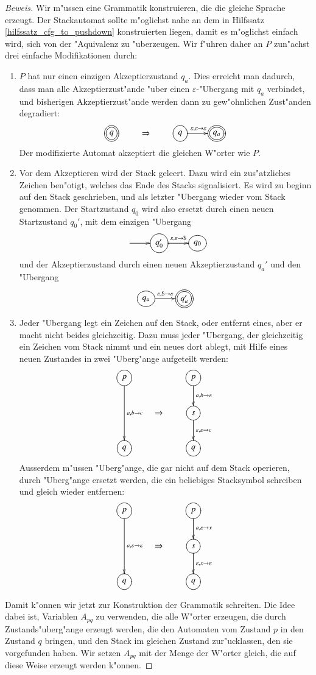 \begin{proof}[Beweis]
Wir m"ussen eine Grammatik konstruieren, die die gleiche Sprache
erzeugt. Der Stackautomat sollte m"oglichst nahe an dem in
Hilfssatz \ref{hilfssatz_cfg_to_pushdown} konstruierten liegen, damit es
m"oglichst einfach wird, sich von der "Aquivalenz zu "uberzeugen.
Wir f"uhren daher an $P$ zun"achst drei einfache Modifikationen
durch: 
\begin{enumerate}
\item $P$ hat nur einen einzigen Akzeptierzustand
$q_a$.
Dies erreicht man dadurch, dass man alle Akzeptierzust"ande "uber
einen $\varepsilon$-"Ubergang mit
$q_a$ verbindet, und bisherigen Akzeptierzust"ande
werden dann zu gew"ohnlichen Zust"anden degradiert:
\[
\xymatrix{
*++[o][F=]{q}
	&\Rightarrow
		&*++[o][F]{q}\ar[r]^{\varepsilon,\varepsilon\to\varepsilon}
			&*++[o][F=]{q_a}
}		
\]
Der modifizierte Automat akzeptiert die gleichen W"orter wie $P$.
\item Vor dem Akzeptieren wird der Stack geleert. Dazu wird ein zus"atzliches
Zeichen ben"otigt, welches das Ende des Stacks signalisiert. Es wird zu
beginn auf den Stack geschrieben, und als letzter "Ubergang wieder
vom Stack genommen. Der Startzustand $q_0$ wird also ersetzt durch einen neuen
Startzustand $q_0'$, mit dem einzigen "Ubergang 
\[
\entrymodifiers={++[o][F]}
\xymatrix{
*+\txt{}\ar[r]
	&{q_0'}\ar[r]^{\varepsilon,\varepsilon\to {\tt\$}}
		&q_0
}
\]
und der Akzeptierzustand  durch einen neuen Akzeptierzustand $q_a'$ und
den "Ubergang
\[
\entrymodifiers={++[o][F]}
\xymatrix{
{q_a}\ar[r]^{\varepsilon,{\tt\$}\to\varepsilon}
	&*++[o][F=]{q_a'}
}
\]
\item Jeder "Ubergang legt ein Zeichen auf den Stack, oder entfernt
eines, aber er macht nicht beides gleichzeitig. Dazu muss jeder "Ubergang,
der gleichzeitig ein Zeichen vom Stack nimmt und ein neues dort ablegt,
mit Hilfe eines neuen Zustandes in zwei "Uberg"ange aufgeteilt werden:
\[
\xymatrix{
*++[o][F]{p}\ar[dd]^{a,b\to c}
	&*+\txt{}
		&*++[o][F]{p}\ar[d]^{a,b\to\varepsilon}
\\
	&\Rightarrow
		&*++[o][F]{s}\ar[d]^{\varepsilon,\varepsilon\to c}
\\
*++[o][F]{q}
	&
		&*++[o][F]{q}
}
\]
Ausserdem m"ussen "Uberg"ange, die gar nicht auf dem Stack operieren,
durch "Uberg"ange ersetzt werden, die ein beliebiges Stacksymbol
schreiben und gleich wieder entfernen:
\[
\xymatrix{
*++[o][F]{p}\ar[dd]^{a,\varepsilon\to \varepsilon}
	&*+\txt{}
		&*++[o][F]{p}\ar[d]^{a,\varepsilon\to x}
\\
	&\Rightarrow
		&*++[o][F]{s}\ar[d]^{\varepsilon,x\to \varepsilon}
\\
*++[o][F]{q}
	&
		&*++[o][F]{q}
}
\]
\end{enumerate}
Damit k"onnen wir jetzt zur Konstruktion der Grammatik schreiten.
Die Idee dabei ist, Variablen $A_{pq}$ zu verwenden, die alle 
W"orter erzeugen, die durch Zustands"uberg"ange erzeugt werden,
die den Automaten vom Zustand $p$ in den Zustand $q$ bringen,
und den Stack im gleichen Zustand zur"ucklassen, den sie vorgefunden
haben.
Wir setzen $A_{pq}$ mit der Menge der W"orter gleich, die
auf diese Weise erzeugt werden k"onnen.


\end{proof}
